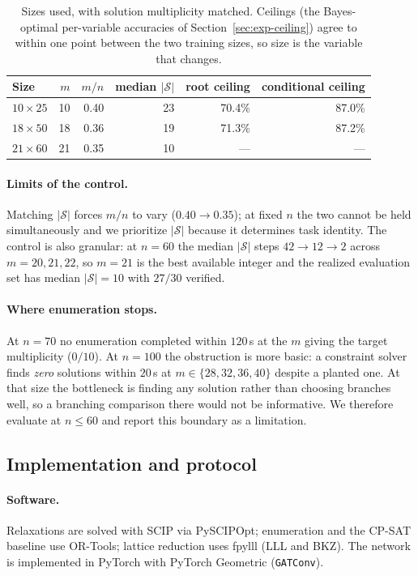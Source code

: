 \documentclass[11pt]{article}
\newcommand{\SOL}{\mathcal{S}}
\begin{document}
\begin{table}[h]
\centering
\begin{tabular}{lrrrrr}
\toprule
Size & $m$ & $m/n$ & median $|\SOL|$ & root ceiling & conditional ceiling \\
\midrule
$10\times25$ & 10 & 0.40 & 23 & 70.4\% & 87.0\% \\
$18\times50$ & 18 & 0.36 & 19 & 71.3\% & 87.2\% \\
$21\times60$ & 21 & 0.35 & 10 & --- & --- \\
\bottomrule
\end{tabular}
\caption{Sizes used, with solution multiplicity matched. Ceilings (the Bayes-optimal per-variable accuracies of Section~\ref{sec:exp-ceiling}) agree to within one point between the two training sizes, so size is the variable that changes.}
\label{tab:sizes}
\end{table}

\paragraph{Limits of the control.} Matching $|\SOL|$ forces $m/n$ to vary ($0.40\to0.35$); at fixed $n$ the two cannot be held simultaneously and we prioritize $|\SOL|$ because it determines task identity. The control is also granular: at $n=60$ the median $|\SOL|$ steps $42\to12\to2$ across $m=20,21,22$, so $m=21$ is the best available integer and the realized evaluation set has median $|\SOL|=10$ with $27/30$ verified.

\paragraph{Where enumeration stops.} At $n=70$ no enumeration completed within $120$\,s at the $m$ giving the target multiplicity ($0/10$). At $n=100$ the obstruction is more basic: a constraint solver finds \emph{zero} solutions within $20$\,s at $m\in\{28,32,36,40\}$ despite a planted one. At that size the bottleneck is finding any solution rather than choosing branches well, so a branching comparison there would not be informative. We therefore evaluate at $n\le 60$ and report this boundary as a limitation.

\subsection{Implementation and protocol}
\label{sec:exp-protocol}

\paragraph{Software.} Relaxations are solved with SCIP via PySCIPOpt; enumeration and the CP-SAT baseline use OR-Tools; lattice reduction uses fpylll (LLL and BKZ). The network is implemented in PyTorch with PyTorch Geometric (\texttt{GATConv}).
\end{document}

